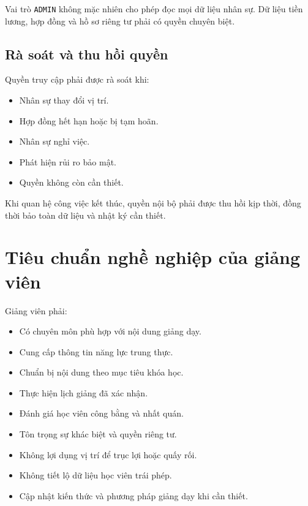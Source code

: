 \documentclass[12pt,a4paper]{article}
\begin{document}
Vai trò \texttt{ADMIN} không mặc nhiên cho phép đọc mọi dữ liệu nhân sự.
Dữ liệu tiền lương, hợp đồng và hồ sơ riêng tư phải có quyền chuyên biệt.

\subsection{Rà soát và thu hồi quyền}

Quyền truy cập phải được rà soát khi:

\begin{itemize}
    \item Nhân sự thay đổi vị trí.
    \item Hợp đồng hết hạn hoặc bị tạm hoãn.
    \item Nhân sự nghỉ việc.
    \item Phát hiện rủi ro bảo mật.
    \item Quyền không còn cần thiết.
\end{itemize}

Khi quan hệ công việc kết thúc, quyền nội bộ phải được thu hồi kịp thời,
đồng thời bảo toàn dữ liệu và nhật ký cần thiết.

\section{Tiêu chuẩn nghề nghiệp của giảng viên}

Giảng viên phải:

\begin{itemize}
    \item Có chuyên môn phù hợp với nội dung giảng dạy.
    \item Cung cấp thông tin năng lực trung thực.
    \item Chuẩn bị nội dung theo mục tiêu khóa học.
    \item Thực hiện lịch giảng đã xác nhận.
    \item Đánh giá học viên công bằng và nhất quán.
    \item Tôn trọng sự khác biệt và quyền riêng tư.
    \item Không lợi dụng vị trí để trục lợi hoặc quấy rối.
    \item Không tiết lộ dữ liệu học viên trái phép.
    \item Cập nhật kiến thức và phương pháp giảng dạy khi cần thiết.
\end{itemize}

\end{document}
